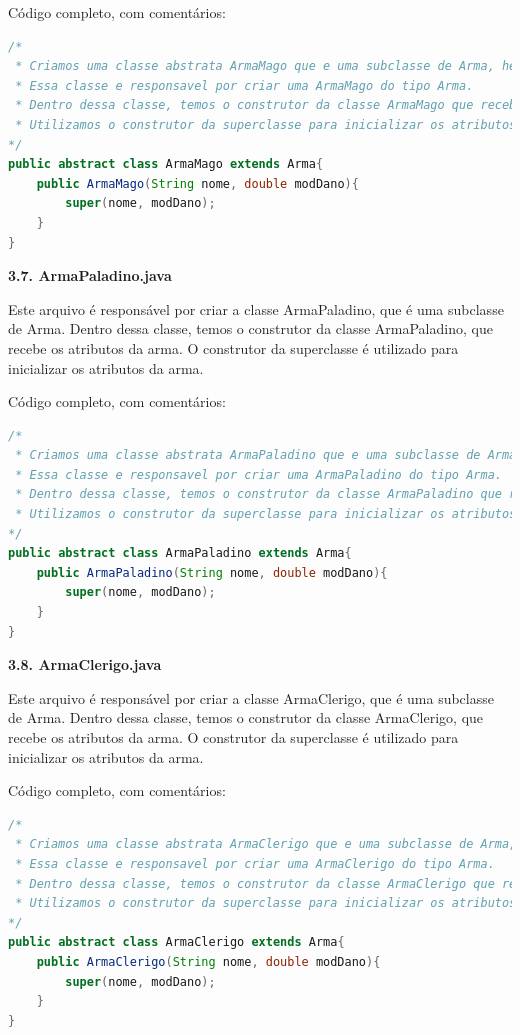 \documentclass[11pt]{uiobrev}
\begin{document}
Código completo, com comentários: 

\begin{lstlisting}[language=Java, caption={Classe ArmaMago, subclasse de Arma}]
/*
 * Criamos uma classe abstrata ArmaMago que e uma subclasse de Arma, herdando os atributos de arma. 
 * Essa classe e responsavel por criar uma ArmaMago do tipo Arma.
 * Dentro dessa classe, temos o construtor da classe ArmaMago que recebe o nome e o modificador de dano.
 * Utilizamos o construtor da superclasse para inicializar os atributos de arma.
*/
public abstract class ArmaMago extends Arma{
    public ArmaMago(String nome, double modDano){
        super(nome, modDano);
    }
}
\end{lstlisting}

\vspace{0.5cm}
\Large \textbf{3.7. ArmaPaladino.java}

Este arquivo é responsável por criar a classe ArmaPaladino, que é uma subclasse de Arma. Dentro dessa classe, temos o construtor da classe ArmaPaladino, que recebe os atributos da arma. O construtor da superclasse é utilizado para inicializar os atributos da arma.

Código completo, com comentários: 

\begin{lstlisting}[language=Java, caption={Classe ArmaPaladino, subclasse de Arma}]
/*
 * Criamos uma classe abstrata ArmaPaladino que e uma subclasse de Arma, herdando os atributos de arma. 
 * Essa classe e responsavel por criar uma ArmaPaladino do tipo Arma.
 * Dentro dessa classe, temos o construtor da classe ArmaPaladino que recebe o nome e o modificador de dano.
 * Utilizamos o construtor da superclasse para inicializar os atributos de arma.
*/
public abstract class ArmaPaladino extends Arma{
    public ArmaPaladino(String nome, double modDano){
        super(nome, modDano);
    }
}
\end{lstlisting}

\vspace{0.5cm}
\Large \textbf{3.8. ArmaClerigo.java}

Este arquivo é responsável por criar a classe ArmaClerigo, que é uma subclasse de Arma. Dentro dessa classe, temos o construtor da classe ArmaClerigo, que recebe os atributos da arma. O construtor da superclasse é utilizado para inicializar os atributos da arma.

Código completo, com comentários: 

\newpage
\begin{lstlisting}[language=Java, caption={Classe ArmaClerigo, subclasse de Arma}]
/*
 * Criamos uma classe abstrata ArmaClerigo que e uma subclasse de Arma, herdando os atributos de arma. 
 * Essa classe e responsavel por criar uma ArmaClerigo do tipo Arma.
 * Dentro dessa classe, temos o construtor da classe ArmaClerigo que recebe o nome e o modificador de dano.
 * Utilizamos o construtor da superclasse para inicializar os atributos de arma.
*/
public abstract class ArmaClerigo extends Arma{
    public ArmaClerigo(String nome, double modDano){
        super(nome, modDano);
    }
}
\end{lstlisting}
\end{document}
